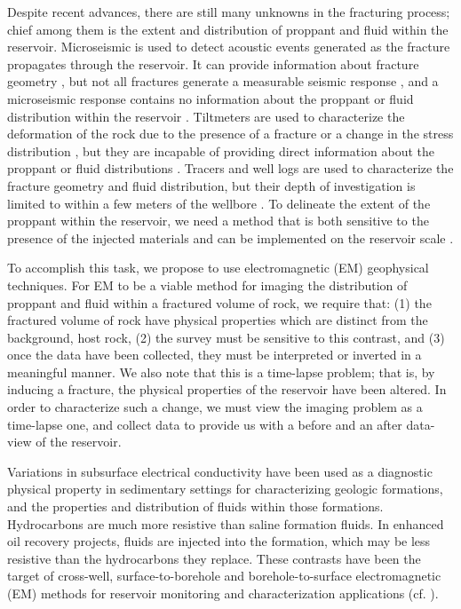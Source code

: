 

Despite recent advances, there are still many unknowns in the fracturing process; chief among them is the extent and distribution of proppant and fluid within the reservoir. Microseismic is used to detect acoustic events generated as the fracture propagates through the reservoir. It can provide information about fracture geometry \citep{Cipolla2009,Warpinski1996,Maxwell2002}, but not all fractures generate a measurable seismic response \citep{Cipolla2000,Barree2002}, and a microseismic response contains no information about the proppant or fluid distribution within the reservoir \citep{Warpinski1996,Barree2002}. Tiltmeters are used to characterize the deformation of the rock due to the presence of a fracture or a change in the stress distribution \citep{Wright1998}, but they are incapable of providing direct information about the proppant or fluid distributions \citep{Cipolla2000,Warpinski1996}. Tracers and well logs are used to characterize the fracture geometry and fluid distribution, but their depth of investigation is limited to within a few meters of the wellbore \citep{Cipolla2000}. To delineate the extent of the proppant within the reservoir, we need a method that is both sensitive to the presence of the injected materials and can be implemented on the reservoir scale \citep{Cipolla2000,Warpinski1996,Barree2002,Cipolla2009}.

To accomplish this task, we propose to use electromagnetic (EM) geophysical techniques. For EM to be a viable method for imaging the distribution of proppant and fluid within a fractured volume of rock, we require that: (1) the fractured volume of rock have physical properties which are distinct from the background, host rock, (2) the survey must be sensitive to this contrast, and (3) once the data have been collected, they must be interpreted or inverted in a meaningful manner. We also note that this is a time-lapse problem; that is, by inducing a fracture, the physical properties of the reservoir have been altered. In order to characterize such a change, we must view the imaging problem as a time-lapse one, and collect data to provide us with a before and an after data-view of the reservoir.

Variations in subsurface electrical conductivity have been used as a diagnostic physical property in sedimentary settings for characterizing geologic formations, and the properties and distribution of fluids within those formations. Hydrocarbons are much more resistive than saline formation fluids. In enhanced oil recovery projects, fluids are injected into the formation, which may be less resistive than the hydrocarbons they replace. These contrasts have been the target of cross-well, surface-to-borehole and borehole-to-surface electromagnetic (EM) methods for reservoir monitoring and characterization applications (cf. \cite{Bevc1991, Wilt1995, marsala2008, marsala2011, marsala2014}).

